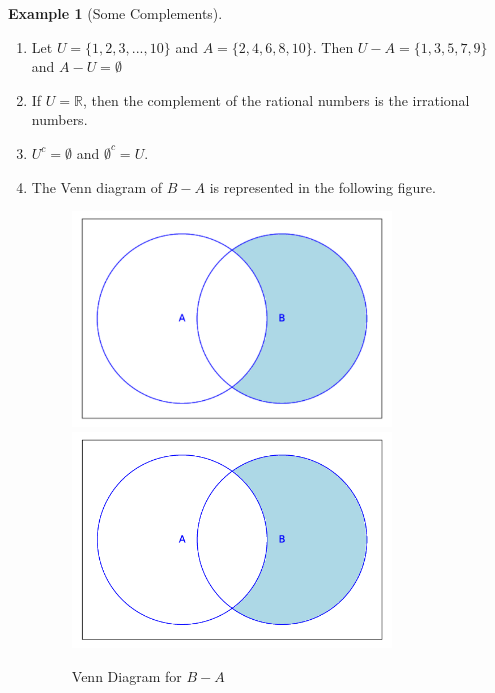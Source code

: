 \documentclass[10pt,]{book}
\theoremstyle{plain}
\theoremstyle{definition}
\newtheorem{example}[theorem]{Example}
\begin{document}
\label{notation-5}
\begin{example}[Some Complements]\label{complements}
\leavevmode%
\begin{enumerate}
\item\hypertarget{li-55}{} Let \(U = \{1,2, 3, \text{...} , 10\}\) and \(A = \{2,4,6,8, 10\}\). Then \(U-A = \{1, 3, 5, 7, 9\}\) and \(A - U= \emptyset\)
\item\hypertarget{li-56}{} If \(U = \mathbb{R}\), then the complement of the rational numbers is the irrational numbers. 
\item\hypertarget{li-57}{} \(U^c= \emptyset\) and \(\emptyset ^c= U\). 
\item\hypertarget{li-58}{} The Venn diagram of \(B - A\) is represented in the following figure. 
            \leavevmode%
\begin{figure}
\centering
{}%
{\includegraphics[width=0.80\textwidth]{images/sageplot-venn-complement1.pdf}}%
{\includegraphics[width=0.80\textwidth]{images/sageplot-venn-complement1.png}}
\caption{Venn Diagram for \(B - A\)\label{venn_diagram_complement1}}
\end{figure}
 

\end{enumerate}
\end{example}
\end{document}
